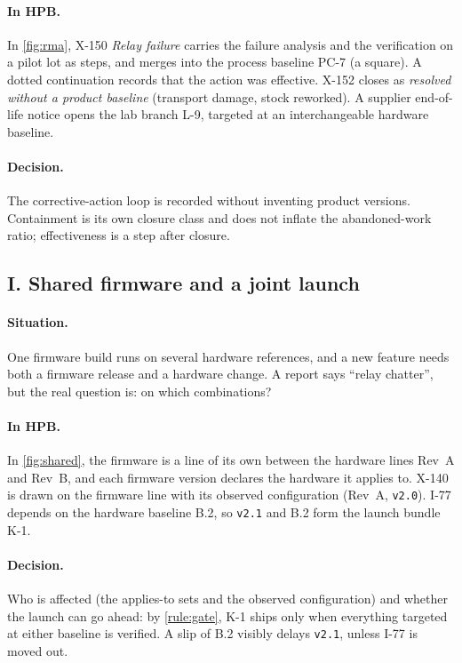 \paragraph{In HPB.}
In \cref{fig:rma}, X-150 \emph{Relay failure} carries the failure analysis
and the verification on a pilot lot as steps, and merges into the process
baseline PC-7 (a square). A dotted continuation records that the action
was effective. X-152 closes as \emph{resolved without a product baseline}
(transport damage, stock reworked). A supplier end-of-life notice opens
the lab branch L-9, targeted at an interchangeable hardware baseline.

\paragraph{Decision.}
The corrective-action loop is recorded without inventing product
versions. Containment is its own closure class and does not inflate the
abandoned-work ratio; effectiveness is a step after closure.

\subsection{I. Shared firmware and a joint launch}
\label{sec:cond-shared}



\paragraph{Situation.}
One firmware build runs on several hardware references, and a new feature
needs both a firmware release and a hardware change. A report says
``relay chatter'', but the real question is: on which combinations?

\paragraph{In HPB.}
In \cref{fig:shared}, the firmware is a line of its own between the
hardware lines Rev~A and Rev~B, and each firmware version declares the
hardware it applies to. X-140 is drawn on the firmware line with its
observed configuration (Rev~A, \texttt{v2.0}). I-77 depends on the
hardware baseline B.2, so \texttt{v2.1} and B.2 form the launch bundle
K-1.

\paragraph{Decision.}
Who is affected (the applies-to sets and the observed configuration) and
whether the launch can go ahead: by \cref{rule:gate}, K-1 ships only when
everything targeted at either baseline is verified. A slip of B.2 visibly
delays \texttt{v2.1}, unless I-77 is moved out.
